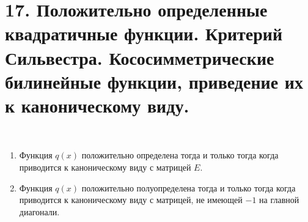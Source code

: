 \section{17. Положительно определенные квадратичные функции. Критерий Сильвестра. Кососимметрические билинейные функции, приведение их к каноническому виду.}

\begin{proposition}~
    \label{pr10.1}
    \begin{enumerate}
        \item Функция $q(x)$ положительно определена тогда и только тогда когда приводится к каноническому
        виду с матрицей $E$.
        \item Функция $q(x)$ положительно полуопределена тогда и только тогда когда приводится к 
        каноническому виду с матрицей, не имеющей $-1$ на главной диагонали.
    \end{enumerate}
\end{proposition}


